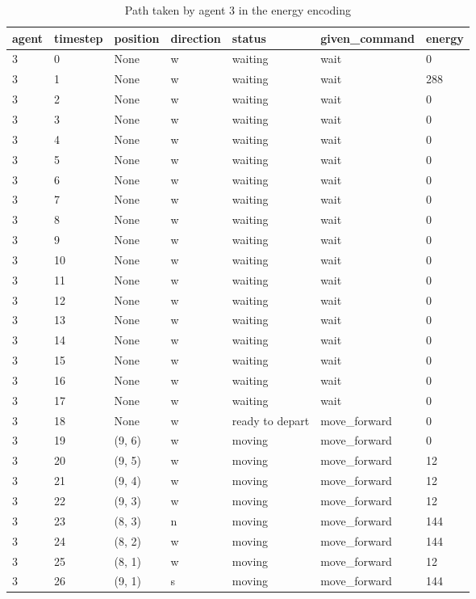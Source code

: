 \begin{table}[H]
  \centering
  \caption{Path taken by agent 3 in the energy encoding}
  \label{tab:energy3}
  \begin{tabular}{lllllll}
    \toprule
    agent & timestep & position & direction & status & given\_command & energy \\
    \midrule
3 & 0 & None & w & waiting & wait & 0 \\
3 & 1 & None & w & waiting & wait & 288 \\
3 & 2 & None & w & waiting & wait & 0 \\
3 & 3 & None & w & waiting & wait & 0 \\
3 & 4 & None & w & waiting & wait & 0 \\
3 & 5 & None & w & waiting & wait & 0 \\
3 & 6 & None & w & waiting & wait & 0 \\
3 & 7 & None & w & waiting & wait & 0 \\
3 & 8 & None & w & waiting & wait & 0 \\
3 & 9 & None & w & waiting & wait & 0 \\
3 & 10 & None & w & waiting & wait & 0 \\
3 & 11 & None & w & waiting & wait & 0 \\
3 & 12 & None & w & waiting & wait & 0 \\
3 & 13 & None & w & waiting & wait & 0 \\
3 & 14 & None & w & waiting & wait & 0 \\
3 & 15 & None & w & waiting & wait & 0 \\
3 & 16 & None & w & waiting & wait & 0 \\
3 & 17 & None & w & waiting & wait & 0 \\
3 & 18 & None & w & ready to depart & move\_forward & 0 \\
3 & 19 & (9, 6) & w & moving & move\_forward & 0 \\
3 & 20 & (9, 5) & w & moving & move\_forward & 12 \\
3 & 21 & (9, 4) & w & moving & move\_forward & 12 \\
3 & 22 & (9, 3) & w & moving & move\_forward & 12 \\
3 & 23 & (8, 3) & n & moving & move\_forward & 144 \\
3 & 24 & (8, 2) & w & moving & move\_forward & 144 \\
3 & 25 & (8, 1) & w & moving & move\_forward & 12 \\
3 & 26 & (9, 1) & s & moving & move\_forward & 144 \\

\end{tabular}
\end{table}
